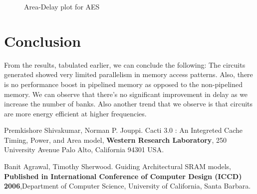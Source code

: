 \documentclass[a4paper, twoside]{article}      %
\begin{document}
\begin{figure}[h!]
{\centering {} \par}
\caption{Area-Delay plot for AES}
\end{figure}


\section{Conclusion}
From the results, tabulated earlier, we can conclude the following:
The circuits generated showed very limited parallelism in memory access patterns. Also, there is no performance boost in pipelined memory as opposed to the non-pipelined memory. We can observe that there's no significant improvement in delay as we increase the number of banks.
Also another trend that we observe is that circuits are more energy efficient at higher frequencies.



\newpage
{}
\begin{thebibliography}{99}

\bibitem{} Premkishore Shivakumar, Norman P. Jouppi. Cacti 3.0 : An Integreted Cache Timing, Power, and Area model,
{\bf Western Research Laboratory}, 250 University Avenue Palo Alto, California 94301 USA.


\bibitem{} Banit Agrawal, Timothy Sherwood. Guiding Architectural SRAM models, 
{\bf Published in International Conference of Computer Design (ICCD) 2006},Department of Computer Science, University of California, Santa Barbara.


\end{thebibliography}
\end{document}
